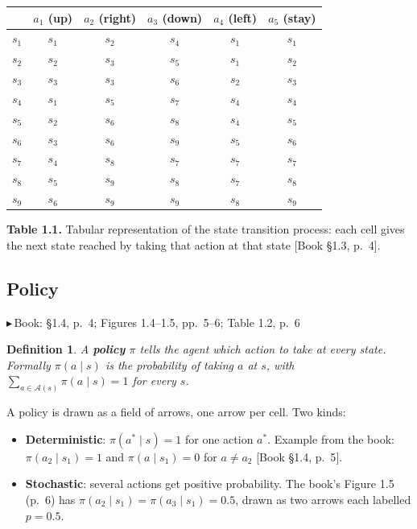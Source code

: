\documentclass[11pt, letterpaper]{article}
\theoremstyle{runin}
\newtheorem*{definition}{Definition}
\theoremstyle{runinplain}
\theoremstyle{remark}
\newcommand{\Aspace}{\mathcal{A}}
\newcommand{\bk}[1]{{\color{bookblue}\small$\blacktriangleright$\,\textsf{Book: #1}}}
\newcommand{\bkin}[1]{{\color{bookblue}\small[\textsf{Book #1}]}}
\begin{document}
\begin{table}[htbp]\centering\footnotesize
\begin{tabular}{@{}l|ccccc@{}}
\toprule
 & $a_1$ (up) & $a_2$ (right) & $a_3$ (down) & $a_4$ (left) & $a_5$ (stay)\\
\midrule
$s_1$ & $s_1$ & $s_2$ & $s_4$ & $s_1$ & $s_1$\\
$s_2$ & $s_2$ & $s_3$ & $s_5$ & $s_1$ & $s_2$\\
$s_3$ & $s_3$ & $s_3$ & $s_6$ & $s_2$ & $s_3$\\
$s_4$ & $s_1$ & $s_5$ & $s_7$ & $s_4$ & $s_4$\\
$s_5$ & $s_2$ & $s_6$ & $s_8$ & $s_4$ & $s_5$\\
$s_6$ & $s_3$ & $s_6$ & $s_9$ & $s_5$ & $s_6$\\
$s_7$ & $s_4$ & $s_8$ & $s_7$ & $s_7$ & $s_7$\\
$s_8$ & $s_5$ & $s_9$ & $s_8$ & $s_7$ & $s_8$\\
$s_9$ & $s_6$ & $s_9$ & $s_9$ & $s_8$ & $s_9$\\
\bottomrule
\end{tabular}\par\smallskip
{\footnotesize\textbf{Table 1.1.} Tabular representation of the state transition process: each cell gives
the next state reached by taking that action at that state \bkin{\S1.3, p.~4}.}
\end{table}


\subsection{Policy}

\bk{\S1.4, p.~4; Figures 1.4--1.5, pp.~5--6; Table 1.2, p.~6}

\begin{definition}
A \textbf{policy} $\pi$ tells the agent which action to take at every state.
Formally $\pi(a\mid s)$ is the probability of taking $a$ at $s$, with
$\sum_{a\in\Aspace(s)}\pi(a\mid s)=1$ for every $s$.
\end{definition}

A policy is drawn as a field of arrows, one arrow per cell. Two kinds:

\begin{itemize}
  \item \textbf{Deterministic}: $\pi(a^*\mid s)=1$ for one action $a^*$. Example
        from the book: $\pi(a_2\mid s_1)=1$ and $\pi(a\mid s_1)=0$ for $a\neq a_2$
        \bkin{\S1.4, p.~5}.
  \item \textbf{Stochastic}: several actions get positive probability. The book's
        Figure 1.5 (p.~6) has $\pi(a_2\mid s_1)=\pi(a_3\mid s_1)=0.5$, drawn as two
        arrows each labelled $p=0.5$.
\end{itemize}
\end{document}
